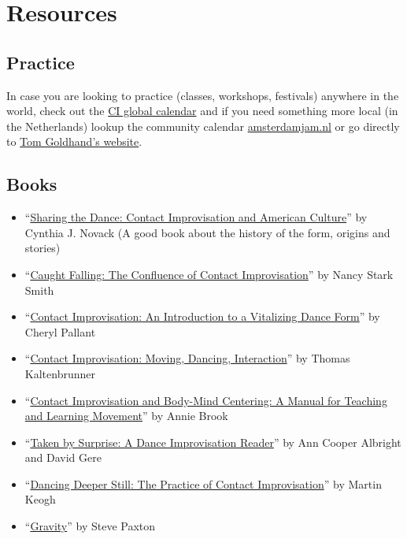 \section{Resources}\label{sec:resources}

\subsection{Practice}\label{subsec:practice}

In case you are looking to practice (classes, workshops, festivals) anywhere in the world, check out the \href{https://ciglobalcalendar.net}{CI global calendar} and if you need something more local (in the Netherlands) lookup the community calendar \href{https://amsterdamjam.nl}{amsterdamjam.nl} or go directly to \href{https://tomgoldhand.com}{Tom Goldhand's website}.

\subsection{Books}\label{subsec:books}

\begin{itemize}
    \setlength\itemsep{0em}
    \item ``\href{https://www.amazon.com/Sharing-Dance-Improvisation-Directions-Anthropological/dp/0299124444}{Sharing the Dance: Contact Improvisation and American Culture}'' by Cynthia J. Novack (A good book about the history of the form, origins and stories)
    \item ``\href{https://www.amazon.com/Caught-Falling-Confluence-Contact-Improvisation/dp/0937645095}{Caught Falling: The Confluence of Contact Improvisation}'' by Nancy Stark Smith
    \item ``\href{https://www.amazon.com/Contact-Improvisation-Introduction-Vitalizing-Dance/dp/0786426470}{Contact Improvisation: An Introduction to a Vitalizing Dance Form}'' by Cheryl Pallant
    \item ``\href{https://www.amazon.com/Contact-Improvisation-Dancing-Interaction-Introduction/dp/1841261386}{Contact Improvisation: Moving, Dancing, Interaction}'' by Thomas Kaltenbrunner
    \item ``\href{https://www.amazon.com/Improvisation-Body-Mind-Centering-Teaching-Learning/dp/0976044900}{Contact Improvisation and Body-Mind Centering: A Manual for Teaching and Learning Movement}'' by Annie Brook
    \item ``\href{https://www.amazon.com/Taken-Surprise-Dance-Improvisation-Reader/dp/0819566489}{Taken by Surprise: A Dance Improvisation Reader}'' by Ann Cooper Albright and David Gere
    \item ``\href{https://www.amazon.com/Dancing-Deeper-Still-Practice-Improvisation/dp/1775243044}{Dancing Deeper Still: The Practice of Contact Improvisation}'' by Martin Keogh
    \item ``\href{https://contredanse.org/en/product/gravity/}{Gravity}'' by Steve Paxton
\end{itemize}


